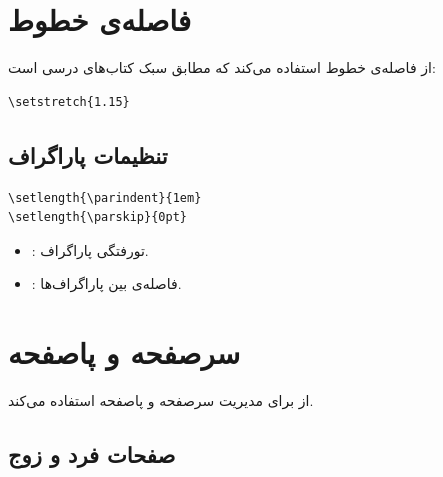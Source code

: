 
\section{فاصله‌ی خطوط}
\label{sec:layout-spacing}

 از فاصله‌ی خطوط 
استفاده می‌کند که مطابق سبک کتاب‌های درسی
 است:

\begin{latin}
\begin{verbatim}
\setstretch{1.15}
\end{verbatim}
\end{latin}


\subsection{تنظیمات پاراگراف}
\label{sec:layout-paragraph}

\begin{latin}
\begin{verbatim}
\setlength{\parindent}{1em}
\setlength{\parskip}{0pt}
\end{verbatim}
\end{latin}

\begin{itemize}
    \item {}: تورفتگی پاراگراف.
    \item {}: فاصله‌ی بین پاراگراف‌ها.
\end{itemize}


\section{سرصفحه و پاصفحه}
\label{sec:layout-headers}

 از  برای مدیریت
سرصفحه و پاصفحه استفاده می‌کند.

\subsection{صفحات فرد و زوج}
\label{sec:layout-headers-oddeven}

